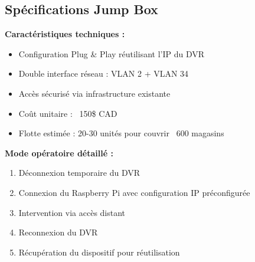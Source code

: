 \documentclass{dollarama}
\begin{document}
\begin{dollaramaappendix}
\section{Spécifications Jump Box}
\textbf{Caractéristiques techniques :}
\begin{itemize}
\item Configuration Plug \& Play réutilisant l'IP du DVR
\item Double interface réseau : VLAN 2 + VLAN 34
\item Accès sécurisé via infrastructure existante
\item Coût unitaire : ~150\$ CAD
\item Flotte estimée : 20-30 unités pour couvrir ~600 magasins
\end{itemize}

\textbf{Mode opératoire détaillé :}
\begin{enumerate}
\item Déconnexion temporaire du DVR
\item Connexion du Raspberry Pi avec configuration IP préconfigurée
\item Intervention via accès distant
\item Reconnexion du DVR
\item Récupération du dispositif pour réutilisation
\end{enumerate}
\end{dollaramaappendix}
\end{document}

